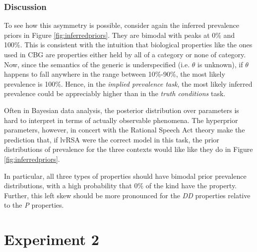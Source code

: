 \documentclass[10pt,letterpaper]{article}
\begin{document}
\subsubsection{Discussion}

To see how this asymmetry is possible, consider again the inferred prevalence priors in Figure \ref{fig:inferredpriors}. They are bimodal with peaks at 0\% and 100\%. This is consistent with the intuition that biological properties like the ones used in CBG are properties either held by all of a category or none of category. Now, since the semantics of the generic is underspecified (i.e. $\theta$ is unknown), if $\theta$ happens to fall anywhere in the range between 10\%-90\%, the most likely prevalence is 100\%. Hence, in the \emph{implied prevalence task}, the most likely inferred prevalence could be appreciably higher than in the \emph{truth conditions} task. 




Often in Bayesian data analysis, the posterior distribution over parameters is hard to interpret in terms of actually observable phenomena. The hyperprior parameters, however, in concert with the Rational Speech Act theory make the prediction that, if lvRSA were the correct model in this task, the prior distributions of prevalence for the three contexts would like like they do in Figure \ref{fig:inferredpriors}. 

In particular, all three types of properties should have bimodal prior prevalence distributions, with a high probability that 0\% of the kind have the property. Further, this left skew should be more pronounced for the \emph{DD} properties relative to the \emph{P} properties. 

\section{Experiment 2}
\end{document}
